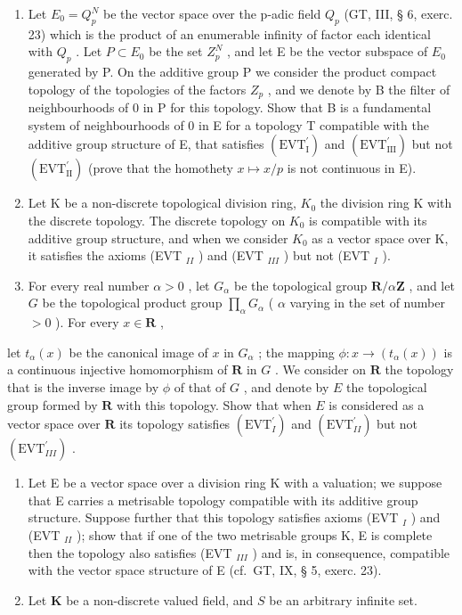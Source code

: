 \exercisegroup

\begin{enumerate}
\def\labelenumi{\arabic{enumi})}
\item
  Let \(E_{0}=Q_{p}^{N}\) be the vector space over the p-adic field \(Q_{p}\) (GT, III, § 6, exerc. 23) which is the product of an enumerable infinity of factor each identical with \(Q_{p}\) . Let \(P\subset E_{0}\) be the set \(Z_{p}^{N}\) , and let E be the vector subspace of \(E_{0}\) generated by P. On the additive group P we consider the product compact topology of the topologies of the factors \(Z_{p}\) , and we denote by B the filter of neighbourhoods of 0 in P for this topology. Show that B is a fundamental system of neighbourhoods of 0 in E for a topology T compatible with the additive group structure of E, that satisfies \((\mathrm{EVT}_{\mathrm{I}}^{\prime})\) and \((\mathrm{EVT}_{\mathrm{III}}^{\prime})\) but not \((\mathrm{EVT}_{\mathrm{II}}^{\prime})\) (prove that the homothety \(x\mapsto x/p\) is not continuous in E).
\item
  Let K be a non-discrete topological division ring, \(K_{0}\) the division ring K with the discrete topology. The discrete topology on \(K_{0}\) is compatible with its additive group structure, and when we consider \(K_{0}\) as a vector space over K, it satisfies the axioms (EVT \(_{II}\) ) and (EVT \(_{III}\) ) but not (EVT \(_{I}\) ).
\item
  For every real number \(\alpha > 0\) , let \(G_{\alpha}\) be the topological group \(\mathbf{R} / \alpha \mathbf{Z}\) , and let \(G\) be the topological product group \(\prod_{\alpha} G_{\alpha}\) ( \(\alpha\) varying in the set of number \(>0\) ). For every \(x \in \mathbf{R}\) ,
\end{enumerate}

let \(t_{\alpha}(x)\) be the canonical image of \(x\) in \(G_{\alpha}\) ; the mapping \(\phi : x \to (t_{\alpha}(x))\) is a continuous injective homomorphism of \(\mathbf{R}\) in \(G\) . We consider on \(\mathbf{R}\) the topology that is the inverse image by \(\phi\) of that of \(G\) , and denote by \(E\) the topological group formed by \(\mathbf{R}\) with this topology. Show that when \(E\) is considered as a vector space over \(\mathbf{R}\) its topology satisfies \((\mathrm{EVT}_{I}^{\prime})\) and \((\mathrm{EVT}_{II}^{\prime})\) but not \((\mathrm{EVT}_{III}^{\prime})\) .

\begin{enumerate}
\def\labelenumi{\arabic{enumi})}
\setcounter{enumi}{3}
\item
  Let E be a vector space over a division ring K with a valuation; we suppose that E carries a metrisable topology compatible with its additive group structure. Suppose further that this topology satisfies axioms (EVT \(_{I}\) ) and (EVT \(_{II}\) ); show that if one of the two metrisable groups K, E is complete then the topology also satisfies (EVT \(_{III}\) ) and is, in consequence, compatible with the vector space structure of E (cf.~GT, IX, § 5, exerc. 23).
\item
  Let \(\mathbf{K}\) be a non-discrete valued field, and \(S\) be an arbitrary infinite set.
\end{enumerate}


